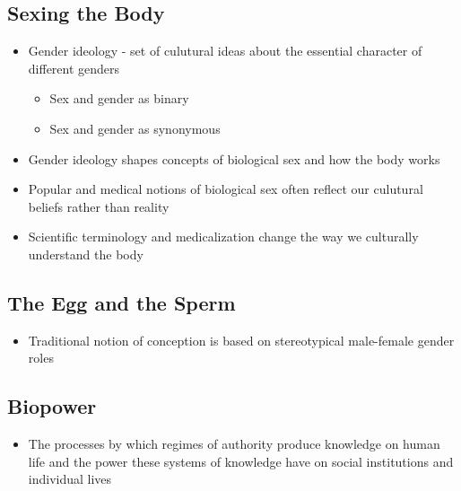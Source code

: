 \documentclass[a4paper]{article}
\begin{document}
\subsection{Sexing the Body}
\begin{itemize}
\item Gender ideology - set of culutural ideas about the essential character of different genders \begin{itemize}
\item Sex and gender as binary
\item Sex and gender as synonymous
\end{itemize}
\item Gender ideology shapes concepts of biological sex and how the body works
\item Popular and medical notions of biological sex often reflect our culutural beliefs rather than reality
\item Scientific terminology and medicalization change the way we culturally understand the body
\end{itemize}

\subsection{The Egg and the Sperm}
\begin{itemize}
\item Traditional notion of conception is based on stereotypical male-female gender roles
\end{itemize}

\subsection{Biopower}
\begin{itemize}
\item The processes by which regimes of authority produce knowledge on human life and the power these systems of knowledge have on social institutions and individual lives
\end{itemize}
\end{document}
